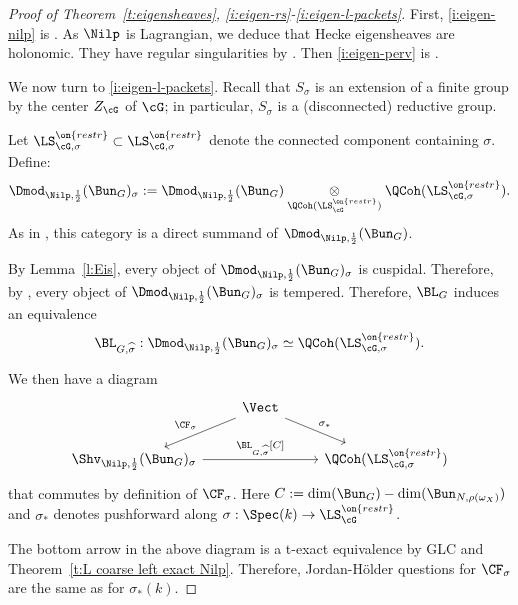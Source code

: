 \documentclass[9pt]{amsart}
\theoremstyle{remark}
\theoremstyle{definition}
\theoremstyle{remark}
\newcommand{\thmref}[1]{Theorem~\ref{#1}}
\newcommand{\lemref}[1]{Lemma~\ref{#1}}
\numberwithin{equation}{section}
\begin{document}
\begin{proof}[Proof of \thmref{t:eigensheaves}, 
\eqref{i:eigen-rs}-\eqref{i:eigen-l-packets}]

First, \eqref{i:eigen-nilp} is \cite[Cor. 14.4.10]{AGKRRV}.
As $\Nilp$ is Lagrangian, we deduce that Hecke eigensheaves 
are holonomic. They have regular singularities 
by \cite[Cor. 16.5.7]{AGKRRV}. 
Then \eqref{i:eigen-perv} is \cite[Thm. 11.2.1.2]{FR}.

\medskip 

We now turn to \eqref{i:eigen-l-packets}. Recall that 
$S_{\sigma}$ is an extension of a finite group by 
the center $Z_{\cG}$ of $\cG$; in particular, $S_{\sigma}$ is 
a (disconnected) reductive group.  

\medskip 

Let $\LS_{\cG,\sigma}^{\on{restr}} \subset \LS_{\cG,\sigma}^{\on{restr}}$ denote the connected component containing 
$\sigma$. Define:
%
\[
\Dmod_{\Nilp,\frac{1}{2}}(\Bun_G)_{\sigma} :=
\Dmod_{\Nilp,\frac{1}{2}}(\Bun_G) 
\underset{\QCoh(\LS_{\cG}^{\on{restr}})}
{\otimes}
\QCoh(\LS_{\cG,\sigma}^{\on{restr}}).
\]
%
\noindent As in \cite[Cor. 14.3.5]{AGKRRV}, this category
is a direct summand of $\Dmod_{\Nilp,\frac{1}{2}}(\Bun_G)$.

\medskip 

By \lemref{l:Eis}, every object of $\Dmod_{\Nilp,\frac{1}{2}}(\Bun_G)_{\sigma}$
is cuspidal. Therefore, by \cite{Be1}, every object of 
$\Dmod_{\Nilp,\frac{1}{2}}(\Bun_G)_{\sigma}$ is tempered. 
Therefore, $\BL_G$ induces an equivalence
%
\[
\BL_{G,\widehat{\sigma}}:\Dmod_{\Nilp,\frac{1}{2}}(\Bun_G)_{\sigma} \simeq 
\QCoh(\LS_{\cG,\sigma}^{\on{restr}}).
\]

We then have a diagram
%
\[
\begin{tikzcd} 
&
\Vect 
\arrow[dl,swap,"\CF_{\sigma}"] 
\arrow[dr,"\sigma_*"]
\\
\Shv_{\Nilp,\frac{1}{2}}(\Bun_G)_{\sigma}
\arrow[rr,"\BL_{G,\widehat{\sigma}}{[C]}
"]
&&
\QCoh(\LS_{\cG,\sigma}^{\on{restr}})
\end{tikzcd}
\]
%
\noindent that commutes by definition of $\CF_{\sigma}$. Here 
$C:= \dim(\Bun_G) - \dim(\Bun_{N,\rho(\omega_X)})$
and $\sigma_*$ denotes
pushforward along $\sigma:\Spec(k) \to \LS_{\cG}^{\on{restr}}$.

\medskip 

The bottom arrow in the above diagram is a t-exact equivalence by GLC and 
\thmref{t:L coarse left exact Nilp}. Therefore, Jordan-H\"older questions for 
$\CF_{\sigma}$ are the same as for 
$\sigma_*(k)$. 


\end{proof}
\end{document}
